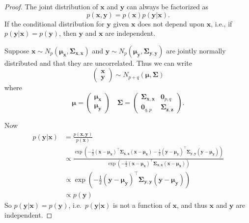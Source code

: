\documentclass[
]{book}
\theoremstyle{definition}
\theoremstyle{definition}
\theoremstyle{definition}
\theoremstyle{definition}
\theoremstyle{remark}
\begin{document}
\begin{proof}
The joint distribution of \(\mathbf x\) and \(\mathbf y\) can always be factorized as
\[p(\mathbf x, \mathbf y)= p(\mathbf x)p(\mathbf y|\mathbf x).\]
If the conditional distribution for \(\mathbf y\) given \(\mathbf x\) does not depend upon \(\mathbf x\), i.e., if \(p(\mathbf y| \mathbf x)=p(\mathbf y)\), then \(\mathbf y\) and \(\mathbf x\) are independent.

Suppose \(\mathbf x\sim N_p({\boldsymbol{\mu}}_\mathbf x, \boldsymbol{\Sigma}_{\mathbf x,\mathbf x})\) and \(\mathbf y\sim N_p({\boldsymbol{\mu}}_\mathbf y, \boldsymbol{\Sigma}_{\mathbf y,\mathbf y})\) are jointly normally distributed and that they are uncorrelated. Thus we can write
\[\begin{pmatrix}\mathbf x\\ \mathbf y\end{pmatrix}\sim N_{p+q}\left({\boldsymbol{\mu}}, \boldsymbol{\Sigma}\right)
\]
where
\[{\boldsymbol{\mu}}= \begin{pmatrix}{\boldsymbol{\mu}}_\mathbf x\\ {\boldsymbol{\mu}}_{\mathbf y}\end{pmatrix}\quad \boldsymbol{\Sigma}= \begin{pmatrix} \boldsymbol{\Sigma}_{\mathbf x, \mathbf x} &{\boldsymbol 0}_{p,q}\\
{\boldsymbol 0}_{q,p} & \boldsymbol{\Sigma}_{\mathbf z, \mathbf z}\end{pmatrix}.\]

Now
\begin{align*}
p(\mathbf y|\mathbf x)&=\frac{p(\mathbf x, \mathbf y)}{p(\mathbf x)}\\
  &\propto \frac{\exp\left(-\frac{1}{2}(\mathbf x-{\boldsymbol{\mu}}_\mathbf x)^\top \boldsymbol{\Sigma}_{\mathbf x,\mathbf x}(\mathbf x-{\boldsymbol{\mu}}_\mathbf x) -\frac{1}{2}(\mathbf y-{\boldsymbol{\mu}}_\mathbf y)^\top \boldsymbol{\Sigma}_{\mathbf y,\mathbf y}(\mathbf y-{\boldsymbol{\mu}}_\mathbf y)\right)}{\exp\left(-\frac{1}{2}(\mathbf x-{\boldsymbol{\mu}}_\mathbf x)^\top \boldsymbol{\Sigma}_{\mathbf x,\mathbf x}(\mathbf x-{\boldsymbol{\mu}}_\mathbf x)\right)} \\
&\propto \exp\left(-\frac{1}{2}(\mathbf y-{\boldsymbol{\mu}}_\mathbf y)^\top \boldsymbol{\Sigma}_{\mathbf y,\mathbf y}(\mathbf y-{\boldsymbol{\mu}}_\mathbf y)\right) \\
&\propto p(\mathbf y)
\end{align*}
So \(p(\mathbf y|\mathbf x)=p(\mathbf y)\), i.e.~\(p(\mathbf y|\mathbf x)\) is not a function of \(\mathbf x\), and thus \(\mathbf x\) and \(\mathbf y\) are independent.
\end{proof}
\end{document}
